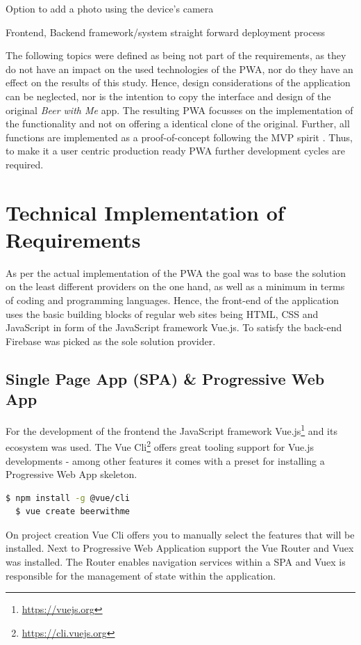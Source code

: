 Option to add a photo using the device’s camera


Frontend, Backend framework/system
straight forward deployment process

The following topics were defined as being not part of the requirements, as they do not have an impact on the used technologies of the PWA, nor do they have an effect on the results of this study. Hence, design considerations of the application can be neglected, nor is the intention to copy the interface and design of the original \textit{Beer with Me} app. The resulting PWA focusses on the implementation of the functionality and not on offering a identical clone of the original. Further, all functions are implemented as a proof-of-concept following the MVP spirit \citep{wikipediaMinimumViableProduct2019}. Thus, to make it a user centric production ready PWA further development cycles are required.


\section{Technical Implementation of Requirements}
As per the actual implementation of the PWA the goal was to base the solution on the least different providers on the one hand, as well as a minimum in terms of coding and programming languages. Hence, the front-end of the application uses the basic building blocks of regular web sites being HTML, CSS and JavaScript in form of the JavaScript framework Vue.js. To satisfy the back-end Firebase was picked as the sole solution provider.

\subsection{Single Page App (SPA) \& Progressive Web App}
For the development of the frontend the JavaScript framework Vue.js\footnote{\url{https://vuejs.org}} and its ecosystem was used. The Vue Cli\footnote{\url{https://cli.vuejs.org}} offers great tooling support for Vue.js developments - among other features it comes with a preset for installing a Progressive Web App skeleton.

\begin{lstlisting}[language=bash, caption=Installation and project creation commands with the Vue Cli, label=lst:vue-cli]
  $ npm install -g @vue/cli
  $ vue create beerwithme
\end{lstlisting}

On project creation Vue Cli offers you to manually select the features that will be installed. Next to Progressive Web Application support the Vue Router and Vuex was installed. The Router enables navigation services within a SPA and Vuex is responsible for the management of state within the application.

